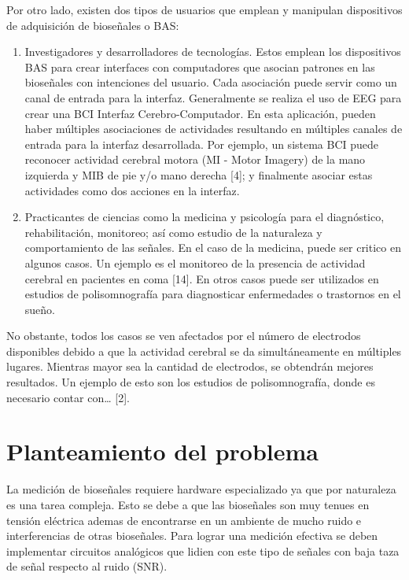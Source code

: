 Por otro lado, existen dos tipos de usuarios que emplean y manipulan dispositivos de adquisición de bioseñales o BAS: 
\begin{enumerate}
\item Investigadores y desarrolladores de tecnologías. Estos emplean los dispositivos BAS para crear interfaces con computadores que asocian patrones en las bioseñales con intenciones del usuario. Cada asociación puede servir como un canal de entrada para la interfaz. Generalmente se realiza el uso de EEG para crear una BCI Interfaz Cerebro-Computador. En esta aplicación, pueden haber múltiples asociaciones de actividades resultando en múltiples canales de entrada para la interfaz desarrollada. Por ejemplo, un sistema BCI puede reconocer actividad cerebral motora (MI - Motor Imagery) de la mano izquierda y MIB de pie y/o mano derecha [4]; y finalmente asociar estas actividades como dos acciones en la interfaz.

\item Practicantes de ciencias como la medicina y psicología para el diagnóstico, rehabilitación, monitoreo; así como estudio de la naturaleza y comportamiento de las señales. En el caso de la medicina, puede ser critico en algunos casos. Un ejemplo es el monitoreo de la presencia de actividad cerebral en pacientes en coma [14].  En otros casos puede ser utilizados en estudios de polisomnografía para diagnosticar enfermedades o trastornos en el sueño.
\end{enumerate}

No obstante, todos los casos se ven afectados por el número de electrodos disponibles debido a que la actividad cerebral se da simultáneamente en múltiples lugares. Mientras mayor sea la cantidad de electrodos, se obtendrán mejores resultados. Un ejemplo  de esto son los estudios de polisomnografía, donde es necesario contar con\ldots{} [2].

\section{Planteamiento del problema}
\label{sec:org1463ca8}

La medición de bioseñales requiere hardware especializado ya que por naturaleza es una tarea compleja. Esto se debe a que las bioseñales son muy tenues en tensión eléctrica ademas de encontrarse en un ambiente de mucho ruido e interferencias de otras bioseñales. Para lograr una medición efectiva se deben implementar circuitos analógicos que lidien con este tipo de señales con baja taza de señal respecto al ruido (SNR).


